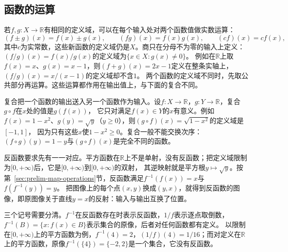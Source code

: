 \subsection{函数的运算}
\label{sec:ru-function-arithmetic}
\label{sec:real-function-arithmetic}

若$f,g:X\to\mathbb R$有相同的定义域，可以在每个输入处对两个函数值做实数运算：
\[
 (f\pm g)(x)=f(x)\pm g(x),\qquad (fg)(x)=f(x)g(x),\qquad (cf)(x)=cf(x),
\]
其中$c$为实常数，这些新函数的定义域仍是$X$。商只在分母不为零的输入上定义：$(f/g)(x)=f(x)/g(x)$的定义域为$\{x\in X:g(x)\neq0\}$。
例如在$\mathbb R$上取$f(x)=x$、$g(x)=x-1$，则$(f+g)(x)=2x-1$定义在整条实轴上，$(f/g)(x)=x/(x-1)$的定义域却不含$1$。
两个函数的定义域不同时，先取公共部分再运算。这些运算都作用在输出值上，与下面的复合不同。

复合把一个函数的输出送入另一个函数作为输入。设$f:X\to\mathbb R$，$g:Y\to\mathbb R$，复合$g\circ f$在$x$处的值是$g(f(x))$，
它只对满足$f(x)\in Y$的$x$有意义。例如$f(x)=1-x^2$、$g(y)=\sqrt y$（$y\geq0$），则$(g\circ f)(x)=\sqrt{1-x^2}$的定义域是$[-1,1]$，
因为只有这些$x$使$1-x^2\geq0$。复合一般不能交换次序：$(f\circ g)(y)=1-y$与$(g\circ f)(x)$是完全不同的函数。

反函数要求先有一一对应。平方函数在$\mathbb R$上不是单射，没有反函数；把定义域限制为$[0,+\infty)$后，它是$[0,+\infty)$到$[0,+\infty)$的双射，
其逆映射就是平方根$y\mapsto\sqrt y$。按第~\ref{sec:prelim-map-operations}节，反函数满足$f^{-1}(f(x))=x$与$f(f^{-1}(y))=y$。
把图像上的每个点$(x,y)$换成$(y,x)$，就得到反函数的图像，即原图像关于直线$y=x$的反射：输入与输出互换了位置。

三个记号需要分清。$f^{-1}$在反函数存在时表示反函数，$1/f$表示逐点取倒数，$f^{-1}(B)=\{x:f(x)\in B\}$表示集合的原像，后者对任何函数都有定义。
以限制在$[0,+\infty)$上的平方函数为例，$f^{-1}(4)=2$，$(1/f)(4)=1/16$；而对定义在$\mathbb R$上的平方函数，原像$f^{-1}(\{4\})=\{-2,2\}$是一个集合，它没有反函数。
